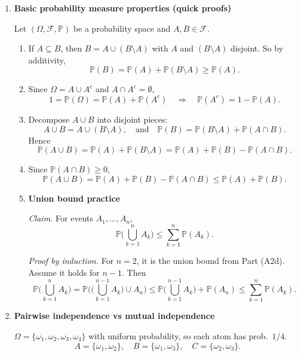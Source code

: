 \documentclass[11pt]{article}
\begin{document}
\begin{enumerate}
\bigskip

\item \textbf{Basic probability measure properties (quick proofs)}

Let $(\Omega,\mathcal{F},\mathbb{P})$ be a probability space and $A,B\in\mathcal{F}$.

\begin{enumerate}[label=(\alph*)]
\item If $A\subseteq B$, then $B=A\cup(B\setminus A)$ with $A$ and $(B\setminus A)$ disjoint.
So by additivity,
\[
\mathbb{P}(B)=\mathbb{P}(A)+\mathbb{P}(B\setminus A)\ge \mathbb{P}(A).
\]

\item Since $\Omega=A\cup A^c$ and $A\cap A^c=\emptyset$,
\[
1=\mathbb{P}(\Omega)=\mathbb{P}(A)+\mathbb{P}(A^c)\quad\Rightarrow\quad \mathbb{P}(A^c)=1-\mathbb{P}(A).
\]

\item Decompose $A\cup B$ into disjoint pieces:
\[
A\cup B = A \cup (B\setminus A),
\quad\text{and}\quad
\mathbb{P}(B)=\mathbb{P}(B\setminus A)+\mathbb{P}(A\cap B).
\]
Hence
\[
\mathbb{P}(A\cup B)=\mathbb{P}(A)+\mathbb{P}(B\setminus A)
= \mathbb{P}(A)+\mathbb{P}(B)-\mathbb{P}(A\cap B).
\]

\item Since $\mathbb{P}(A\cap B)\ge 0$,
\[
\mathbb{P}(A\cup B)=\mathbb{P}(A)+\mathbb{P}(B)-\mathbb{P}(A\cap B)\le \mathbb{P}(A)+\mathbb{P}(B).
\]


\medskip

\item \textbf{Union bound practice }

\emph{Claim.} For events $A_1,\dots,A_n$,
\[
\mathbb{P}\Big(\bigcup_{k=1}^n A_k\Big)\le \sum_{k=1}^n \mathbb{P}(A_k).
\]

\emph{Proof by induction.}
For $n=2$, it is the union bound from Part (A2d).
Assume it holds for $n-1$. Then
\[
\mathbb{P}\Big(\bigcup_{k=1}^n A_k\Big)
=
\mathbb{P}\Big(\Big(\bigcup_{k=1}^{n-1}A_k\Big)\cup A_n\Big)
\le
\mathbb{P}\Big(\bigcup_{k=1}^{n-1}A_k\Big)+\mathbb{P}(A_n)
\le
\sum_{k=1}^{n}\mathbb{P}(A_k).
\]
\bigskip
\end{enumerate}
\item \textbf{Pairwise independence vs mutual independence}

$\Omega=\{\omega_1,\omega_2,\omega_3,\omega_4\}$ with uniform probability, so each atom has prob.\ $1/4$.
\[
A=\{\omega_1,\omega_2\},\quad
B=\{\omega_1,\omega_3\},\quad
C=\{\omega_2,\omega_3\}.
\]


\end{enumerate}
\end{document}
